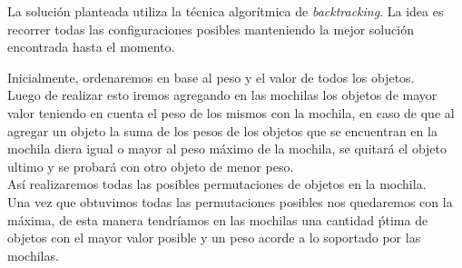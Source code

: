 La soluci\'on planteada utiliza la t\'ecnica algor\'itmica de \textit{backtracking}. La idea es recorrer todas las configuraciones posibles manteniendo la mejor soluci\'on encontrada hasta el momento. 

Inicialmente, ordenaremos en base al peso y el valor de todos los objetos.\\
Luego de realizar esto iremos agregando en las mochilas los objetos de mayor valor teniendo en cuenta el peso de los mismos con la mochila, en caso de que al agregar un objeto la suma de los pesos de los objetos que se encuentran en la mochila diera igual o mayor al peso m\'aximo de la mochila, se quitar\'a el objeto ultimo y se probar\'a con otro objeto de menor peso.\\
As\'i realizaremos todas las posibles permutaciones de objetos en la mochila.\\
Una vez que obtuvimos todas las permutaciones posibles nos quedaremos con la m\'axima, de esta manera tendr\'iamos en las mochilas una cantidad \'ptima de objetos con el mayor valor posible y un peso acorde a lo soportado por las mochilas.\\